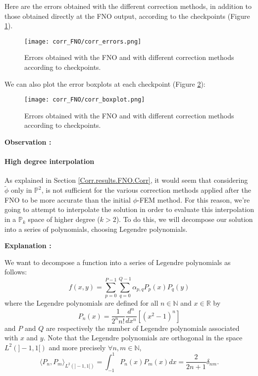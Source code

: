 Here are the errors obtained with the different correction methods, in addition to those obtained directly at the FNO output, according to the checkpoints (Figure \ref{corr_errors}).

\begin{figure}[H]
	\centering
	\texttt{[image: corr\_FNO/corr\_errors.png]}
	\caption{Errors obtained with the FNO and with different correction methods according to checkpoints.}
	\label{corr_errors}
\end{figure} 

We can also plot the error boxplots at each checkpoint (Figure \ref{corr_boxplot}):

\begin{figure}[H]
	\centering
	\texttt{[image: corr\_FNO/corr\_boxplot.png]}
	\caption{Errors obtained with the FNO and with different correction methods according to checkpoints.}
	\label{corr_boxplot}
\end{figure} 

\textbf{Observation :} 

\paragraph{High degree interpolation} \label{Corr.results.FNO.Legendre}

As explained in Section \ref{Corr.results.FNO.Corr}, it would seem that considering $\tilde{\phi}$ only in $\mathbb{P}^2$, is not sufficient for the various correction methods applied after the FNO to be more accurate than the initial $\phi$-FEM method. For this reason, we're going to attempt to interpolate the solution in order to evaluate this interpolation in a $\mathbb{P}_k$ space of higher degree ($k>2$). To do this, we will decompose our solution into a series of polynomials, choosing Legendre polynomials.

\textbf{Explanation :}

We want to decompose a function into a series of Legendre polynomials as follows:
\begin{equation*}
	f(x,y)=\sum_{p=0}^{P-1}\sum_{q=0}^{Q-1}\alpha_{p,q}P_p(x)P_q(y)
	\label{decomp}
\end{equation*}
where the Legendre polynomials are defined for all $n\in\mathbb{N}$ and $x\in\mathbb{R}$ by
\begin{equation*}
	P_n(x)=\frac{1}{2^n n!}\frac{d^n}{dx^n}[(x^2-1)^n]
\end{equation*}
and $P$ and $Q$ are respectively the number of Legendre polynomials associated with $x$ and $y$.
Note that the Legendre polynomials are orthogonal in the space $L^2(]-1,1[)$ and more precisely $\forall n,m\in\mathbb{N}$,
\begin{equation*}
	\langle P_n,P_m\rangle_{L^2(]-1,1[)}=\int_{-1}^1 P_n(x)P_m(x)dx=\frac{2}{2n+1}\delta_{nm}.
	\label{ortho}
\end{equation*}

